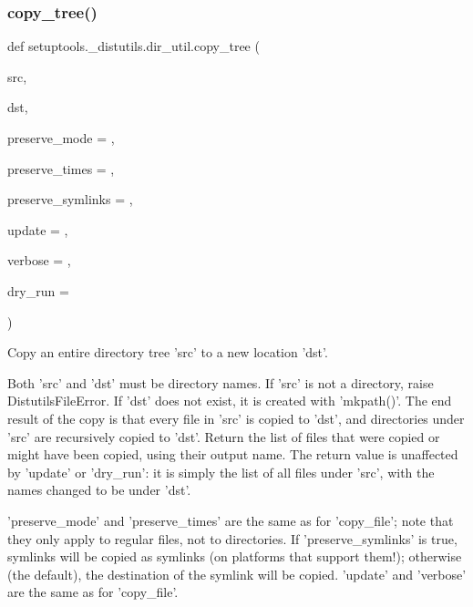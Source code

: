 \subsubsection{\texorpdfstring{copy\+\_\+tree()}{copy\_tree()}}
{\footnotesize\ttfamily def setuptools.\+\_\+distutils.\+dir\+\_\+util.\+copy\+\_\+tree (\begin{DoxyParamCaption}\item[{}]{src,  }\item[{}]{dst,  }\item[{}]{preserve\+\_\+mode = {},  }\item[{}]{preserve\+\_\+times = {},  }\item[{}]{preserve\+\_\+symlinks = {},  }\item[{}]{update = {},  }\item[{}]{verbose = {},  }\item[{}]{dry\+\_\+run = {} }\end{DoxyParamCaption})}

\begin{DoxyVerb}Copy an entire directory tree 'src' to a new location 'dst'.

Both 'src' and 'dst' must be directory names.  If 'src' is not a
directory, raise DistutilsFileError.  If 'dst' does not exist, it is
created with 'mkpath()'.  The end result of the copy is that every
file in 'src' is copied to 'dst', and directories under 'src' are
recursively copied to 'dst'.  Return the list of files that were
copied or might have been copied, using their output name.  The
return value is unaffected by 'update' or 'dry_run': it is simply
the list of all files under 'src', with the names changed to be
under 'dst'.

'preserve_mode' and 'preserve_times' are the same as for
'copy_file'; note that they only apply to regular files, not to
directories.  If 'preserve_symlinks' is true, symlinks will be
copied as symlinks (on platforms that support them!); otherwise
(the default), the destination of the symlink will be copied.
'update' and 'verbose' are the same as for 'copy_file'.
\end{DoxyVerb}
 \mbox{\label{namespacesetuptools_1_1__distutils_1_1dir__util_a80933b11d97a9c38807cc92de3fe923e}} 
